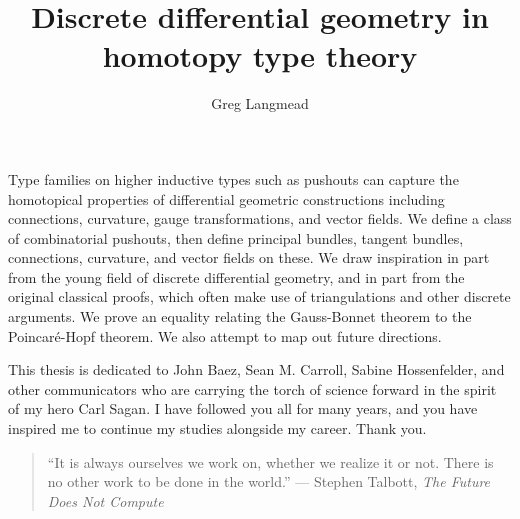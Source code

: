 \documentclass[12pt,fleqn]{article}
\title{Discrete differential geometry in homotopy type theory}
\author{Greg Langmead}
\renewenvironment{abstract}{\section*{\abstractname}}{}
\begin{document}
\maketitle

\begin{abstract}
Type families on higher inductive types such as pushouts can capture the homotopical properties of differential geometric constructions including connections, curvature, gauge transformations, and vector fields. We define a class of combinatorial pushouts, then define principal bundles, tangent bundles, connections, curvature, and vector fields on these. We draw inspiration in part from the young field of discrete differential geometry, and in part from the original classical proofs, which often make use of triangulations and other discrete arguments. We prove an equality relating the Gauss-Bonnet theorem to the Poincaré-Hopf theorem. We also attempt to map out future directions.
\end{abstract}

\begin{dedication}
This thesis is dedicated to John Baez, Sean M. Carroll, Sabine Hossenfelder, and other communicators who are carrying the torch of science forward in the spirit of my hero Carl Sagan. I have followed you all for many years, and you have inspired me to continue my studies alongside my career. Thank you.

\begin{quote} 
\centering
``It is always ourselves we work on, whether we realize it or not. There is no other work to be done in the world.'' --- Stephen Talbott, \emph{The Future Does Not Compute}\cite{talbott}
\end{quote}
\end{dedication}

\listofchanges[title=Changelist]
\listoftodos
\clearpage


\tableofcontents 
\clearpage






\clearpage
% 


\end{document}

